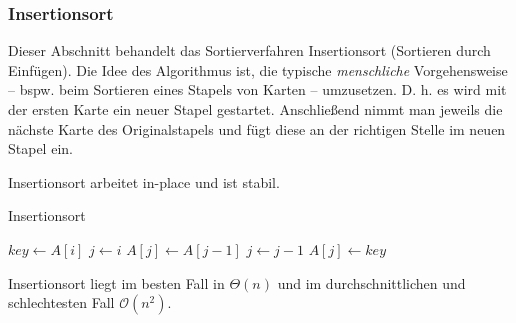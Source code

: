 \subsubsection{Insertionsort}
Dieser Abschnitt behandelt das Sortierverfahren Insertionsort (Sortieren durch Einfügen). Die Idee des Algorithmus ist, die typische \emph{menschliche} Vorgehensweise -- bspw. beim Sortieren eines Stapels von Karten -- umzusetzen. D. h. es wird mit der ersten Karte ein neuer Stapel gestartet. Anschließend nimmt man jeweils die nächste Karte des Originalstapels und fügt diese an der richtigen Stelle im neuen Stapel ein.

\begin{anm}
	Insertionsort arbeitet in-place und ist stabil.
\end{anm}

\begin{algorithm}
	\caption{Insertionsort}
	\begin{algorithmic}[0]
		\State $key \gets A[i]$
		\State $j \gets i$
		\State $A[j] \gets A[j-1]$
		\State $j \gets j - 1$
		\EndWhile
		\State $A[j] \gets key$
		\EndFor
	\end{algorithmic}
\end{algorithm}

\begin{proposition}[Laufzeit]
	Insertionsort liegt im besten Fall in $\Theta(n)$ und im durchschnittlichen und schlechtesten Fall $\mathcal{O}(n^2)$.
\end{proposition}

